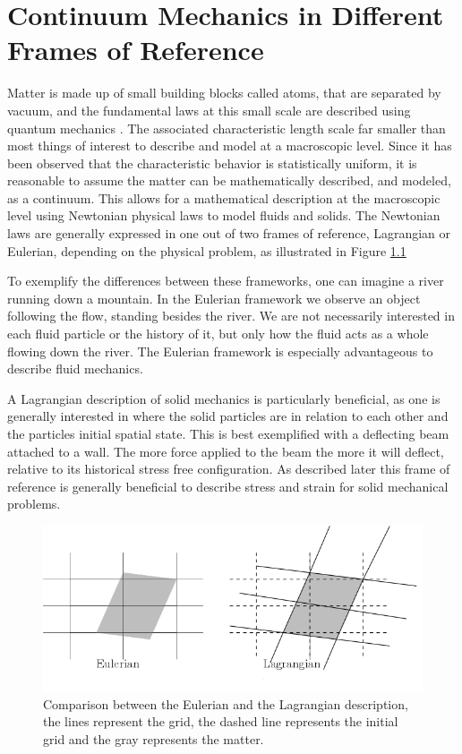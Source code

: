 \chapter{Continuum Mechanics in Different Frames of Reference}
Matter is made up of small building blocks called atoms, that are separated by vacuum, and the fundamental laws at this small scale are described using quantum mechanics \cite{dirac1981principles}. The associated characteristic length scale far smaller than most things of interest to describe and model at a macroscopic level. Since it has been observed that the characteristic behavior is statistically uniform, it is reasonable to assume the matter can be mathematically described, and modeled, as a continuum. This allows for a mathematical description at the macroscopic level using Newtonian physical laws to model fluids and solids. The Newtonian laws are generally expressed in one out of two frames of reference, Lagrangian or Eulerian, depending on the physical problem, as illustrated in Figure \ref{pic:E_L} \newline

To exemplify the differences between these frameworks, one can imagine a river running down a mountain.	
In the Eulerian framework we observe an object following the flow, standing besides the river. We are not necessarily interested in each fluid particle or the history of it, but only how the fluid acts as a whole flowing down the river. The Eulerian framework is especially advantageous to describe fluid mechanics.\newline

A Lagrangian description of solid mechanics is particularly beneficial, as one is generally interested in where the solid particles are in relation to each other and the particles initial spatial state.  
This is best exemplified with a deflecting beam attached to a wall. The more force applied to the beam the more it will deflect, relative to its historical stress free configuration. As described later this frame of reference is generally beneficial to describe stress and strain for solid mechanical problems.\newline

\begin{figure}[H]
\label{pic:E_L}
\includegraphics[scale=0.50]{./Continuum_mechanics/E_L.png}
\caption{Comparison between the Eulerian and the Lagrangian description, the lines represent the grid, the dashed line represents the initial grid and the gray represents the matter.}
\end{figure}

